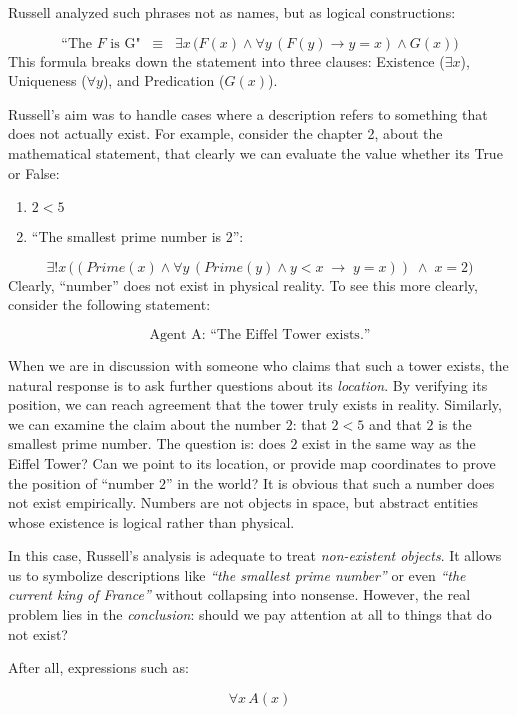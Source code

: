 \documentclass[12pt,a4paper,openany]{article}
\begin{document}
Russell analyzed such phrases not as names, but as logical constructions:

$$
\text{“The } F \text{ is G"}\;\;\equiv\;\; \exists x \, \big( F(x) \land \forall y \, (F(y) \to y = x) \land G(x) \big)
$$
This formula breaks down the statement into three clauses: Existence ($\exists x$), Uniqueness ($\forall y$), and Predication ($G(x)$).

Russell's aim was to handle cases where a description refers to something that does not actually exist. 
For example, consider the chapter 2, about the mathematical statement, that clearly we can evaluate the value whether its True or False:

\begin{enumerate}
    \item $ 2 < 5$
    \item ``The smallest prime number is $2$'':
\end{enumerate}

$$
\exists! x \, \big( (Prime(x) \land \forall y \, (Prime(y) \land y < x \;\to\; y = x)) \;\land\; x = 2 \big)
$$
Clearly, ``number'' does not exist in physical reality. To see this more clearly, consider the following statement:

$$
\text{Agent A: “The Eiffel Tower exists.”}
$$

When we are in discussion with someone who claims that such a tower exists, the natural response is to ask further questions about its \textit{location}. 
By verifying its position, we can reach agreement that the tower truly exists in reality. 
Similarly, we can examine the claim about the number $2$: that $2 < 5$ and that $2$ is the smallest prime number. 
The question is: does $2$ exist in the same way as the Eiffel Tower? Can we point to its location, or provide map coordinates to prove the position of ``number $2$'' in the world? It is obvious that such a number does not exist empirically.
Numbers are not objects in space, but abstract entities whose existence is logical rather than physical.

In this case, Russell's analysis is adequate to treat \textit{non-existent objects}. 
It allows us to symbolize descriptions like \textit{``the smallest prime number''} or even \textit{``the current king of France''} without collapsing into nonsense.
However, the real problem lies in the \textit{conclusion}: should we pay attention at all to things that do not exist?

After all, expressions such as:

$$
\forall x \, A(x)
$$
\end{document}
